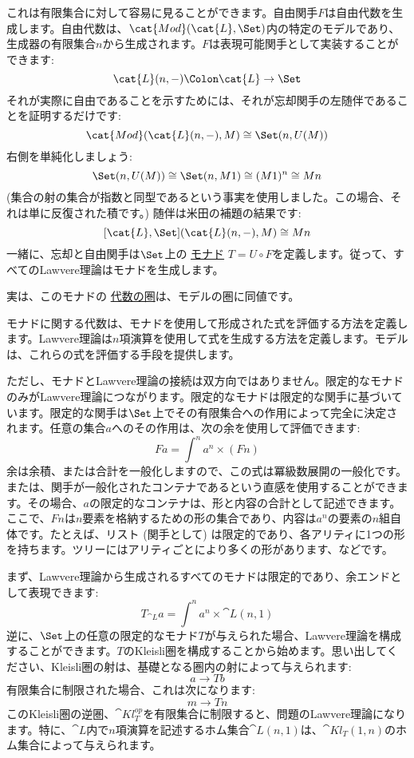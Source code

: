 これは有限集合に対して容易に見ることができます。自由関手$F$は自由代数を生成します。自由代数は、$\cat{Mod}(\cat{L}, \Set)$内の特定のモデルであり、生成器の有限集合$n$から生成されます。$F$は表現可能関手として実装することができます: 
\[\cat{L}(n, -) \Colon \cat{L} \to \Set\]
それが実際に自由であることを示すためには、それが忘却関手の左随伴であることを証明するだけです: 
\[\cat{Mod}(\cat{L}(n, -), M) \cong \Set(n, U(M))\]
右側を単純化しましょう: 
\[\Set(n, U(M)) \cong \Set(n, M 1) \cong (M 1)^n \cong M n\]
 (集合の射の集合が指数と同型であるという事実を使用しました。この場合、それは単に反復された積です。) 随伴は米田の補題の結果です: 
\[[\cat{L}, \Set](\cat{L}(n, -), M) \cong M n\]
一緒に、忘却と自由関手は$\Set$上の
\hyperref[monads-categorically]{モナド}
$T = U \circ F$を定義します。従って、すべてのLawvere理論はモナドを生成します。

実は、このモナドの
\hyperref[algebras-for-monads]{代数の圏}は、モデルの圏に同値です。

モナドに関する代数は、モナドを使用して形成された式を評価する方法を定義します。Lawvere理論は$n$項演算を使用して式を生成する方法を定義します。モデルは、これらの式を評価する手段を提供します。

ただし、モナドとLawvere理論の接続は双方向ではありません。限定的なモナドのみがLawvere理論につながります。限定的なモナドは限定的な関手に基づいています。限定的な関手は$\Set$上でその有限集合への作用によって完全に決定されます。任意の集合$a$へのその作用は、次の余を使用して評価できます: 
\[F a = \int^n a^n \times (F n)\]
余は余積、または合計を一般化しますので、この式は冪級数展開の一般化です。または、関手が一般化されたコンテナであるという直感を使用することができます。その場合、$a$の限定的なコンテナは、形と内容の合計として記述できます。ここで、$F n$は$n$要素を格納するための形の集合であり、内容は$a^n$の要素の$n$組自体です。たとえば、リスト (関手として) は限定的であり、各アリティに1つの形を持ちます。ツリーにはアリティごとにより多くの形があります、などです。

まず、Lawvere理論から生成されるすべてのモナドは限定的であり、余エンドとして表現できます: 
\[T_{\cat{L}} a = \int^n a^n \times \cat{L}(n, 1)\]
逆に、$\Set$上の任意の限定的なモナド$T$が与えられた場合、Lawvere理論を構成することができます。$T$のKleisli圏を構成することから始めます。思い出してください、Kleisli圏の射は、基礎となる圏内の射によって与えられます: 
\[a \to T b\]
有限集合に制限された場合、これは次になります: 
\[m \to T n\]
このKleisli圏の逆圏、$\cat{Kl}^\mathit{op}_{T}$を有限集合に制限すると、問題のLawvere理論になります。特に、$\cat{L}$内で$n$項演算を記述するホム集合$\cat{L}(n, 1)$は、$\cat{Kl}_{T}(1, n)$のホム集合によって与えられます。

